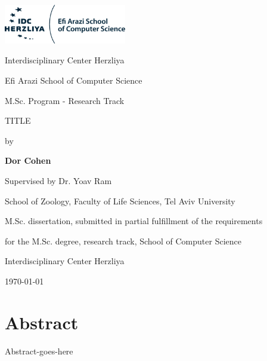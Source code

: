 \documentclass[12pt]{article}
\begin{document}

\begin{titlepage}
	\centering
	\includegraphics[width=0.4\textwidth]{IDC_logo}\par\vspace{1cm}
	{\huge Interdisciplinary Center Herzliya \par}
	{\Large Efi Arazi School of Computer Science \par}
	{\Large M.Sc. Program - Research Track \par}

	\vspace{1.5cm}
	{\Huge TITLE \par}
	\vspace{1.5cm}
	{\large by\par}
	{\Large\bfseries Dor Cohen\par}
	\vspace{1cm}
	{\large Supervised by Dr. Yoav Ram\par}
	{School of Zoology, Faculty of Life Sciences, Tel Aviv University\par}

	\vspace{1cm}
	{M.Sc. dissertation, submitted in partial fulfillment of the requirements\par}
	{for the M.Sc. degree, research track, School of Computer Science\par}
	{Interdisciplinary Center Herzliya}

	\vspace{1cm}
	{\large \monthyeardate\today \par}

\end{titlepage}

\pagebreak

\section*{Abstract}
Abstract-goes-here

\pagebreak

\tableofcontents

\pagebreak
\end{document}
